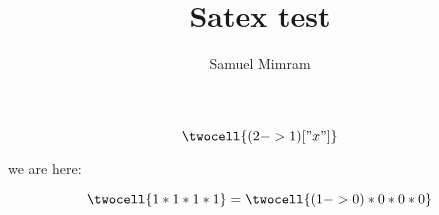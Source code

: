 \documentclass[a4paper]{article}
\title{Satex test}
\author{Samuel Mimram}
\begin{document}
\maketitle


\[
  \twocell{(2->1)["x"]}
\]

we are here:









\[
  \twocell{1*1*1*1}
  =
  \twocell{(1 -> 0)*0*0*0}
\]




\end{document}
